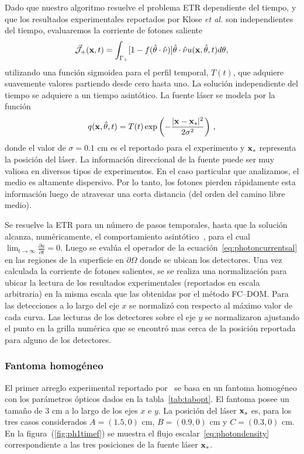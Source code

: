 Dado que nuestro algoritmo resuelve el problema ETR dependiente del tiempo, 
y que los resultados experimentales reportados por Klose \textit{et al.} 
son independientes del tiempo, evaluaremos la corriente de fotones saliente 
\begin{equation}
 \vec{ \mathcal{J}}_+(\mathbf{x},t)=\int_{\Gamma_+} [1-f(\hat{\theta} \cdot \hat{\nu})] \hat{\theta} \cdot \hat{\nu} u(\mathbf{x},\hat{\theta},t) d\theta,
\label{eq:photoncurrentsal}
\end{equation}
utilizando una función sigmoidea para el perfil temporal, $T(t)$, 
que adquiere suavemente valores partiendo desde cero 
hasta uno. La solución independiente del tiempo 
se adquiere a un tiempo asintótico.
La fuente láser se modela por la función
\begin{equation}
q(\mathbf{x},\hat{\theta},t)=T(t)\exp \left(  -\frac{|\mathbf{x}-\mathbf{x}_s|^2}{2\sigma^2} \right)  \, ,
\label{eq:sourceGauss}
\end{equation}
donde el valor de $\sigma=0.1$ cm es el reportado para el experimento y $\mathbf{x}_s$ 
representa la posición del láser. La información direccional de la fuente 
puede ser muy valiosa en diversos tipos de experimentos. 
En el caso particular que analizamos, el medio es altamente dispersivo. Por lo tanto, los 
fotones pierden rápidamente esta información 
luego de atravesar una corta distancia (del orden del camino libre medio).

Se resuelve la ETR para un número de pasos temporales, 
hasta que la solución alcanza, numéricamente, el comportamiento 
asintótico~\cite{Bruno2010}, para el cual $\lim_{t\to \infty} \frac{\partial u}{\partial t}=0$. 
Luego se evalúa el operador de la ecuación~\eqref{eq:photoncurrentsal} 
en las regiones de la superficie en $\partial \Omega$ 
donde se ubican los detectores.
Una vez  calculada la corriente de fotones salientes, se
se realiza una normalización para ubicar la lectura 
de los resultados experimentales (reportados en escala arbitraria) 
en la misma escala que las obtenidas por el método FC--DOM. 
Para las detecciones a lo largo del eje $x$ se normalizó 
con respecto al máximo valor de cada curva. 
 Las lecturas de los detectores sobre el eje $y$ 
 se normalizaron ajustando el punto en la grilla numérica 
 que se encontró mas cerca de la posición reportada 
 para alguno de los detectores. 
 
\subsubsection{Fantoma homogéneo}

El primer arreglo experimental reportado por~\cite{Klose2002} 
se basa en un fantoma homogéneo con los parámetros ópticos 
dados en la tabla~\ref{tab:tabopt}. El fantoma posee un tamaño  
de $3$ cm a lo largo de los ejes $x$ e $y$. La posición del láser 
   $\mathbf{x}_s$ es, para los tres casos considerados $A=(1.5,0)$ cm, $B=(0.9,0)$ cm
    y $C=(0.3,0)$ cm. En la figura~(\ref{fig:ph1timef}) se muestra 
el flujo escalar~\eqref{eq:photondensity} 
correspondiente a las tres posiciones de la fuente láser $\mathbf{x}_s$. 

